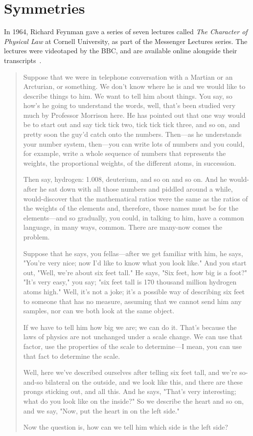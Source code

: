 \clearpage
\section{Symmetries}

In 1964, Richard Feynman gave a series of seven lectures called \emph{The Character of Physical Law} at Cornell University, as part of the Messenger Lectures series. The lectures were videotaped by the BBC, and are available online alongside their transcripts~\cite{Feynman1997-vo}.

\begin{quote}
Suppose that we were in telephone conversation with a Martian or an Arcturian, or something. We don’t know where he is and we would like to describe things to him. We want to tell him about things. You say, so how’s he going to understand the words, well, that’s been studied very much by Professor Morrison here. He has pointed out that one way would be to start out and say tick tick two, tick tick tick three, and so on, and pretty soon the guy’d catch onto the numbers. Then—as he understands your number system, then—you can write lots of numbers and you could, for example, write a whole sequence of numbers that represents the weights, the proportional weights, of the different atoms, in succession.

Then say, hydrogen: 1.008, deuterium, and so on and so on. And he would-after he sat down with all those numbers and piddled around a while, would-discover that the mathematical ratios were the same as the ratios of the weights of the elements and, therefore, those names must be for the elements—and so gradually, you could, in talking to him, have a common language, in many ways, common. There are many-now comes the problem.

Suppose that he says, you fellas—after we get familiar with him, he says, "You’re very nice; now I’d like to know what you look like." And you start out, "Well, we’re about six feet tall." He says, "Six feet, how big is a foot?" "It’s very easy," you say; "six feet tall is 170 thousand million hydrogen atoms high." Well, it’s not a joke; it’s a possible way of describing six feet to someone that has no measure, assuming that we cannot send him any samples, nor can we both look at the same object.

If we have to tell him how big we are; we can do it. That’s because the laws of physics are not unchanged under a scale change. We can use that factor, use the properties of the scale to determine—I mean, you can use that fact to determine the scale.

Well, here we’ve described ourselves after telling six feet tall, and we’re so-and-so bilateral on the outside, and we look like this, and there are these prongs sticking out, and all this. And he says, "That’s very interesting; what do you look like on the inside?" So we describe the heart and so on, and we say, "Now, put the heart in on the left side."

Now the question is, how can we tell him which side is the left side?
\end{quote}

